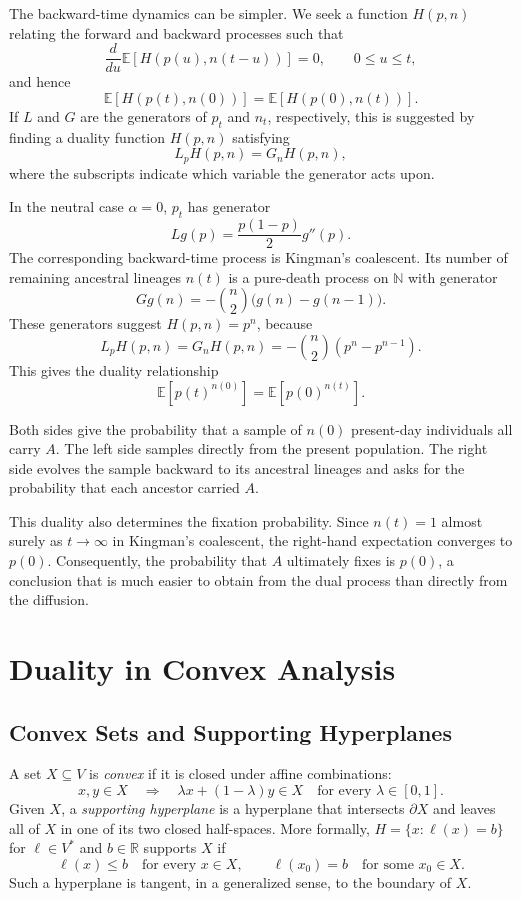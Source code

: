 \documentclass[11pt]{article}
\newcommand{\R}{\mathbb{R}}
\newcommand{\N}{\mathbb{N}}
\newcommand{\E}{\mathbb{E}}
\begin{document}
The backward-time dynamics can be simpler. We seek a function $H(p,n)$ relating
the forward and backward processes such that
\[
  \frac{d}{du}\E[H(p(u),n(t-u))]=0,
  \qquad 0\leq u\leq t,
\]
and hence
\[
  \E[H(p(t),n(0))]=\E[H(p(0),n(t))].
\]
If $L$ and $G$ are the generators of $p_t$ and $n_t$, respectively, this is
suggested by finding a duality function $H(p,n)$ satisfying
\[
  L_pH(p,n)=G_nH(p,n),
\]
where the subscripts indicate which variable the generator acts upon.

In the neutral case $\alpha=0$, $p_t$ has generator
\[
  Lg(p)=\frac{p(1-p)}{2}g''(p).
\]
The corresponding backward-time process is Kingman's coalescent. Its number of
remaining ancestral lineages $n(t)$ is a pure-death process on $\N$ with
generator
\[
  Gg(n)=-\binom{n}{2}\bigl(g(n)-g(n-1)\bigr).
\]
These generators suggest $H(p,n)=p^n$, because
\[
  L_pH(p,n)=G_nH(p,n)=-\binom{n}{2}(p^n-p^{n-1}).
\]
This gives the duality relationship
\[
  \E[p(t)^{n(0)}]=\E[p(0)^{n(t)}].
\]

Both sides give the probability that a sample of $n(0)$ present-day
individuals all carry $A$. The left side samples directly from the present
population. The right side evolves the sample backward to its ancestral
lineages and asks for the probability that each ancestor carried $A$.

This duality also determines the fixation probability. Since $n(t)=1$ almost
surely as $t\to\infty$ in Kingman's coalescent, the right-hand expectation
converges to $p(0)$. Consequently, the probability that $A$ ultimately fixes is
$p(0)$, a conclusion that is much easier to obtain from the dual process than
directly from the diffusion.

\section{Duality in Convex Analysis}


\subsection{Convex Sets and Supporting Hyperplanes}

A set $X\subseteq V$ is \emph{convex} if it is closed under affine
combinations:
\[
  x,y\in X\quad\Longrightarrow\quad
  \lambda x+(1-\lambda)y\in X
  \quad\text{for every }\lambda\in[0,1].
\]
Given $X$, a \emph{supporting hyperplane} is a hyperplane that intersects
$\partial X$ and leaves all of $X$ in one of its two closed half-spaces. More
formally, $H=\{x:\ell(x)=b\}$ for $\ell\in V^*$ and $b\in\R$ supports $X$ if
\[
  \ell(x)\leq b\quad\text{for every }x\in X,
  \qquad
  \ell(x_0)=b\quad\text{for some }x_0\in X.
\]
Such a hyperplane is tangent, in a generalized sense, to the boundary of $X$.
\end{document}
